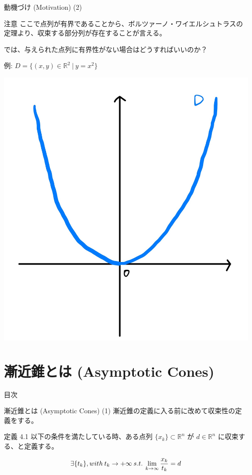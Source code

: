 \documentclass[aspectratio=169, dvipdfmx, 11pt]{beamer} %
\begin{document}
\begin{frame}{動機づけ (Motivation) (2) }
  \begin{alertblock}{注意}
    ここで点列が有界であることから、ボルツァーノ・ワイエルシュトラスの定理より、収束する部分列が存在することが言える。
  \end{alertblock}

\pause
  では、与えられた点列に有界性がない場合はどうすればいいのか？
\pause

  例: $D = \{(x,y) \in \mathbb{R}^2 \:|\: y=x^2\}$

  \centering
  \includegraphics[keepaspectratio, scale=0.06]{figures/unbounded_example.jpg}
\end{frame}

\section{漸近錐とは (Asymptotic Cones) }
\begin{frame}{目次}
    \tableofcontents[currentsection]
\end{frame}

\begin{frame}{漸近錐とは (Asymptotic Cones) (1) }
  漸近錐の定義に入る前に改めて収束性の定義をする。
  \begin{block}{定義 4.1}
    以下の条件を満たしている時、ある点列 $\{ x_k \} \subset \mathbb{R} ^n$ が $d \in \mathbb{R} ^n$ に収束する、と定義する。

    \begin{equation}
      \exists\{ t_k \}, with\: t_k \rightarrow +\infty \:s.t.\: \lim_{k \to \infty} \frac{x_k}{t_k} = d \notag
    \end{equation}
  \end{block}
\end{frame}
\end{document}

